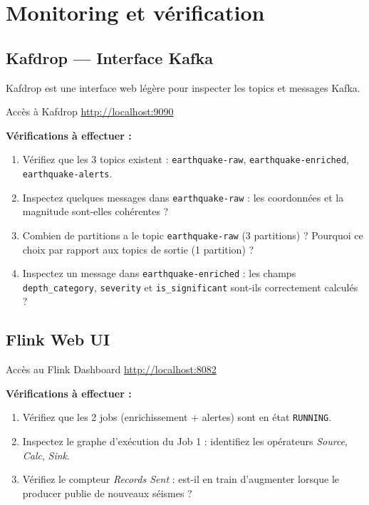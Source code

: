 \documentclass[12pt,a4paper]{article}
\begin{document}
\section{Monitoring et vérification}

\subsection{Kafdrop --- Interface Kafka}

Kafdrop est une interface web légère pour inspecter les topics et messages Kafka.

\begin{infobox}{Accès à Kafdrop}
  \url{http://localhost:9090}
\end{infobox}

\textbf{Vérifications à effectuer :}
\begin{enumerate}
  \item Vérifiez que les 3 topics existent :
        \texttt{earthquake-raw}, \texttt{earthquake-enriched}, \texttt{earthquake-alerts}.
  \item Inspectez quelques messages dans \texttt{earthquake-raw} :
        les coordonnées et la magnitude sont-elles cohérentes ?
  \item Combien de partitions a le topic \texttt{earthquake-raw} (3 partitions) ?
        Pourquoi ce choix par rapport aux topics de sortie (1 partition) ?
  \item Inspectez un message dans \texttt{earthquake-enriched} :
        les champs \texttt{depth\_category}, \texttt{severity} et \texttt{is\_significant}
        sont-ils correctement calculés ?
\end{enumerate}

\subsection{Flink Web UI}

\begin{infobox}{Accès au Flink Dashboard}
  \url{http://localhost:8082}
\end{infobox}

\textbf{Vérifications à effectuer :}
\begin{enumerate}
  \item Vérifiez que les 2 jobs (enrichissement + alertes) sont en état \texttt{RUNNING}.
  \item Inspectez le graphe d'exécution du Job 1 : identifiez les opérateurs
        \textit{Source}, \textit{Calc}, \textit{Sink}.
  \item Vérifiez le compteur \textit{Records Sent} : est-il en train d'augmenter
        lorsque le producer publie de nouveaux séismes ?
\end{enumerate}
\end{document}
